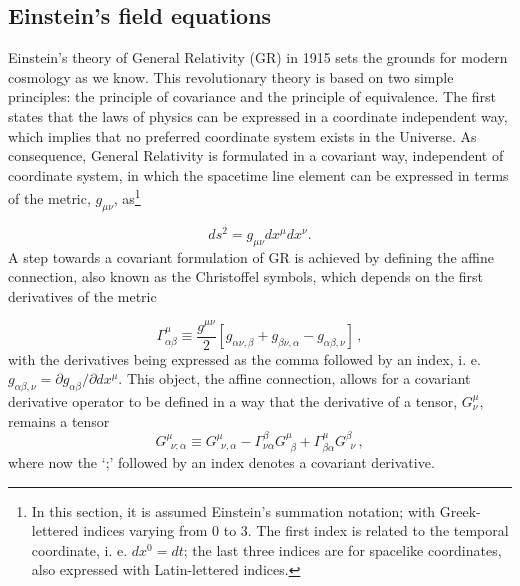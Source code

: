 \subsection{Einstein's field equations}
Einstein's theory of General Relativity (GR) in 1915 sets the grounds for modern cosmology as we know. This revolutionary theory is based on two simple principles: the principle of covariance and the principle of equivalence. The first states that the laws of physics can be expressed in a coordinate independent way, which implies that no preferred coordinate system exists in the Universe. As consequence, General Relativity is formulated in a covariant way, independent of coordinate system, in which the spacetime line element can be expressed in terms of the metric, $g_{\mu\nu}$, as\footnote{ In this section, it is assumed Einstein's summation notation; with Greek-lettered indices varying from 0 to 3. The first index is related to the temporal coordinate, i. e. $dx^0 = dt$; the last three indices are for spacelike coordinates, also expressed with Latin-lettered indices.}

\begin{equation}
ds^2 = g_{\mu\nu}dx^{\mu}dx^{\nu}.
\label{Eq:Intro:LineElement}
\end{equation}
A step towards a covariant formulation of GR is achieved by defining the affine connection, also known as the Christoffel symbols, which depends on the first derivatives of the metric

\begin{equation}
\Gamma_{\alpha\beta}^{\mu} \equiv \frac{g^{\mu\nu}}{2} \left[ g_{\alpha\nu, \beta} + g_{\beta\nu, \alpha} - g_{\alpha\beta,\nu}\right]\, ,
\label{Eq:Intro:ChrisSymb}
\end{equation}
with the derivatives being expressed as the comma followed by an index, i. e. $g_{\alpha\beta, \nu} = \partial g_{\alpha\beta}/ \partial dx^{\mu}$. This object, the affine connection, allows for a covariant derivative operator to be defined in a way that the derivative of a tensor, $G^{\mu}_{\nu}$, remains a tensor
\begin{equation}
G^{\mu}_{\ \ \nu; \alpha} \equiv G^{\mu}_{\ \ \nu, \alpha} - \Gamma_{\nu\alpha}^{\beta}G^{\mu}_{\ \ \beta} + \Gamma_{\beta\alpha}^{\mu} G^{\beta}_{\ \ \nu}\, ,
\end{equation}
where now the `;' followed by an index denotes a covariant derivative.

